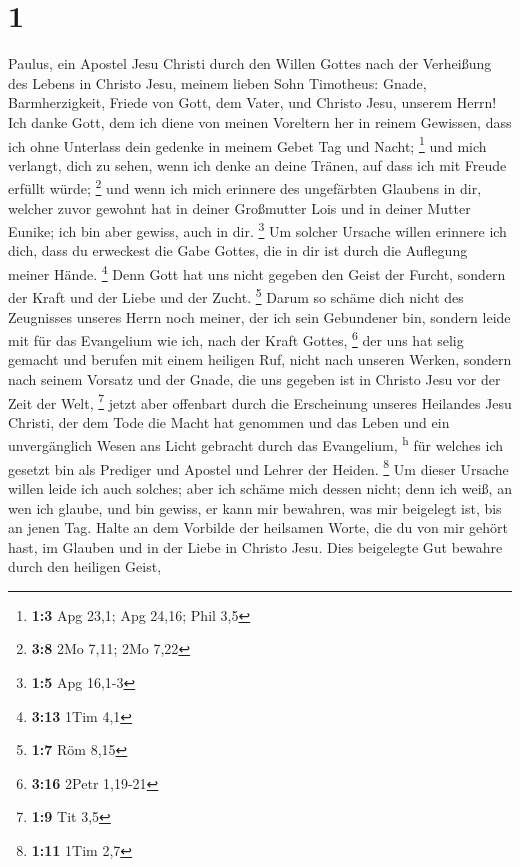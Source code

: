 \hypertarget{section}{%
\section{1}\label{section}}

 Paulus, ein Apostel Jesu Christi durch den Willen Gottes
nach der Verheißung des Lebens in Christo Jesu,  meinem
lieben Sohn Timotheus: Gnade, Barmherzigkeit, Friede von Gott, dem
Vater, und Christo Jesu, unserem Herrn!  Ich danke Gott,
dem ich diene von meinen Voreltern her in reinem Gewissen, dass ich ohne
Unterlass dein gedenke in meinem Gebet Tag und Nacht; \footnote{\textbf{1:3}
  Apg 23,1; Apg 24,16; Phil 3,5}  und mich verlangt, dich
zu sehen, wenn ich denke an deine Tränen, auf dass ich mit Freude
erfüllt würde; \footnote{\textbf{3:8} 2Mo 7,11; 2Mo 7,22} 
und wenn ich mich erinnere des ungefärbten Glaubens in dir, welcher
zuvor gewohnt hat in deiner Großmutter Lois und in deiner Mutter Eunike;
ich bin aber gewiss, auch in dir. \footnote{\textbf{1:5} Apg 16,1-3}
 Um solcher Ursache willen erinnere ich dich, dass du
erweckest die Gabe Gottes, die in dir ist durch die Auflegung meiner
Hände. \footnote{\textbf{3:13} 1Tim 4,1}  Denn Gott hat
uns nicht gegeben den Geist der Furcht, sondern der Kraft und der Liebe
und der Zucht. \footnote{\textbf{1:7} Röm 8,15}  Darum so
schäme dich nicht des Zeugnisses unseres Herrn noch meiner, der ich sein
Gebundener bin, sondern leide mit für das Evangelium wie ich, nach der
Kraft Gottes, \footnote{\textbf{3:16} 2Petr 1,19-21}  der
uns hat selig gemacht und berufen mit einem heiligen Ruf, nicht nach
unseren Werken, sondern nach seinem Vorsatz und der Gnade, die uns
gegeben ist in Christo Jesu vor der Zeit der Welt, \footnote{\textbf{1:9}
  Tit 3,5}  jetzt aber offenbart durch die Erscheinung
unseres Heilandes Jesu Christi, der dem Tode die Macht hat genommen und
das Leben und ein unvergänglich Wesen ans Licht gebracht durch das
Evangelium, \textsuperscript{h}  für welches ich gesetzt
bin als Prediger und Apostel und Lehrer der Heiden. \footnote{\textbf{1:11}
  1Tim 2,7}  Um dieser Ursache willen leide ich auch
solches; aber ich schäme mich dessen nicht; denn ich weiß, an wen ich
glaube, und bin gewiss, er kann mir bewahren, was mir beigelegt ist, bis
an jenen Tag.  Halte an dem Vorbilde der heilsamen Worte,
die du von mir gehört hast, im Glauben und in der Liebe in Christo Jesu.
 Dies beigelegte Gut bewahre durch den heiligen Geist,
